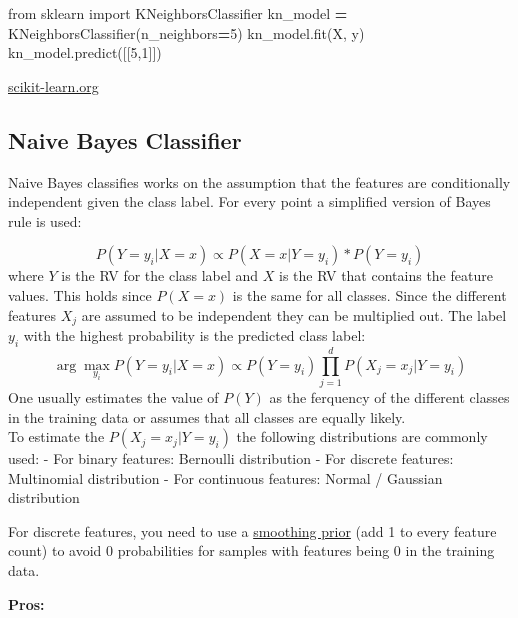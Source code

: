 \documentclass[
]{book}
\newenvironment{Shaded}{\begin{snugshade}}{\end{snugshade}}
\newcommand{\DecValTok}[1]{\textcolor[rgb]{0.00,0.00,0.81}{#1}}
\newcommand{\ImportTok}[1]{#1}
\newcommand{\NormalTok}[1]{#1}
\newcommand{\OperatorTok}[1]{\textcolor[rgb]{0.81,0.36,0.00}{\textbf{#1}}}
\begin{document}
\begin{Shaded}
\begin{Highlighting}[]
\ImportTok{from}\NormalTok{ sklearn }\ImportTok{import}\NormalTok{ KNeighborsClassifier}
\NormalTok{kn\_model }\OperatorTok{=}\NormalTok{ KNeighborsClassifier(n\_neighbors}\OperatorTok{=}\DecValTok{5}\NormalTok{)}
\NormalTok{kn\_model.fit(X, y)}
\NormalTok{kn\_model.predict([[}\DecValTok{5}\NormalTok{,}\DecValTok{1}\NormalTok{]])}
\end{Highlighting}
\end{Shaded}

\href{https://scikit-learn.org/stable/modules/generated/sklearn.neighbors.KNeighborsClassifier.html}{scikit-learn.org}\\

\hypertarget{naive-bayes-classifier}{%
\subsection{Naive Bayes Classifier}\label{naive-bayes-classifier}}

Naive Bayes classifies works on the assumption that the features are
conditionally independent given the class label. For every point a
simplified version of Bayes rule is used:

\[P(Y=y_i|X=x) \propto P(X=x|Y=y_i) * P(Y=y_i) \] where \(Y\) is the RV
for the class label and \(X\) is the RV that contains the feature values.
This holds since \(P(X=x)\) is the same for all classes. Since the
different features \(X_j\) are assumed to be independent they can be
multiplied out. The label \(y_i\) with the highest probability is the
predicted class label:
\[\arg \max_{y_i} P(Y=y_i|X=x) \propto P(Y=y_i) \prod_{j=1}^{d} P(X_j=x_j|Y=y_i)  \]
One usually estimates the value of \(P(Y)\) as the ferquency of the
different classes in the training data or assumes that all classes are
equally likely.\\
To estimate the \(P(X_j=x_j|Y=y_i)\) the following distributions are
commonly used: - For binary features: Bernoulli distribution - For
discrete features: Multinomial distribution - For continuous features:
Normal / Gaussian distribution

For discrete features, you need to use a \href{https://scikit-learn.org/stable/modules/naive_bayes.html\#multinomial-naive-bayes}{smoothing
prior}
(add 1 to every feature count) to avoid 0 probabilities for samples with
features being 0 in the training data.

\textbf{Pros:}
\end{document}
